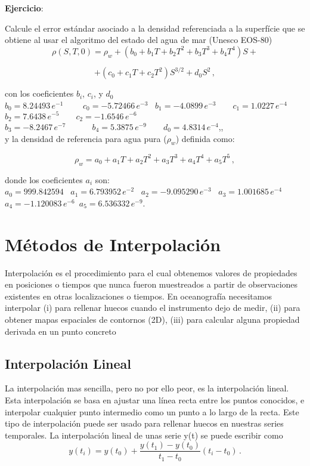 \documentclass[
]{agujournal2019}
\begin{document}
\textbf{Ejercicio}:

Calcule el error estándar asociado a la densidad referenciada a la
superfície que se obtiene al usar el algoritmo del estado del agua de
mar (Unesco EOS-80)
\[\rho(S,T,0)=\rho_w + \left(b_0+b_1 T+b_2 T^2+b_3 T^{3}+b_4 T^{4}\right) S +\]

\[+\left(c_0+c_1 T+c_2 T^2\right) S^{3/2} + d_0 S^2\,,\]

con los coeficientes \(b_i\), \(c_i\), y \(d_0\)\\
\(b_0=8.24493\,e^{-1}\,\,\,\,\,\,\,\,\,\,\,\,\,\,c_0=-5.72466\,e^{-3}\)
~\(b_1=-4.0899\,e^{-3}\,\,\,\,\,\,\,\,\,\,\,\,c_1=1.0227\,e^{-4}\)\\
\(b_2=7.6438\,e^{-5}\,\,\,\,\,\,\,\,\,\,\,\,c_2=-1.6546\,e^{-6}\)\\
\(b_3=-8.2467\,e^{-7}\,\,\,\,\,\,\,\,\,\,\,\,\) ~
\(b_4=5.3875\,e^{-9}\,\,\,\,\,\,\,\,\,\,\,\,d_0=4.8314\,e^{-4}\),,\\

y la densidad de referencia para agua pura (\(\rho_w\)) definida como:

\[\rho_w=a_0+a_1 T+a_2 T^2+a_3 T^{3}+a_4 T^{4}+a_5 T^{5}\,,\]

donde los coeficientes \(a_i\) son:\\
\(a_0=999.842594\) ~\(a_1=6.793952\,e^{-2}\) ~\(a_2=-9.095290\,e^{-3}\)
~\(a_3=1.001685\,e^{-4}\)
~\(a_4=-1.120083\,e^{-6}\)~\(a_5=6.536332\,e^{-9}\).

\section{Métodos de Interpolación}\label{muxe9todos-de-interpolaciuxf3n}

Interpolación es el procedimiento para el cual obtenemos valores de
propiedades en posiciones o tiempos que nunca fueron muestreados a
partir de observaciones existentes en otras localizaciones o tiempos. En
oceanografía necesitamos interpolar (i) para rellenar huecos cuando el
instrumento dejo de medir, (ii) para obtener mapas espaciales de
contornos (2D), (iii) para calcular alguna propiedad derivada en un
punto concreto

\subsection{Interpolación Lineal}\label{interpolaciuxf3n-lineal}

La interpolación mas sencilla, pero no por ello peor, es la
interpolación lineal. Esta interpolación se basa en ajustar una línea
recta entre los puntos conocidos, e interpolar cualquier punto
intermedio como un punto a lo largo de la recta. Este tipo de
interpolación puede ser usado para rellenar huecos en nuestras series
temporales. La interpolación lineal de unas serie y(t) se puede escribir
como \[y(t_i)=y(t_0)+\frac{y(t_1)-y(t_0)}{t_1 - t_0}(t_i-t_0)\,.\]
\end{document}

